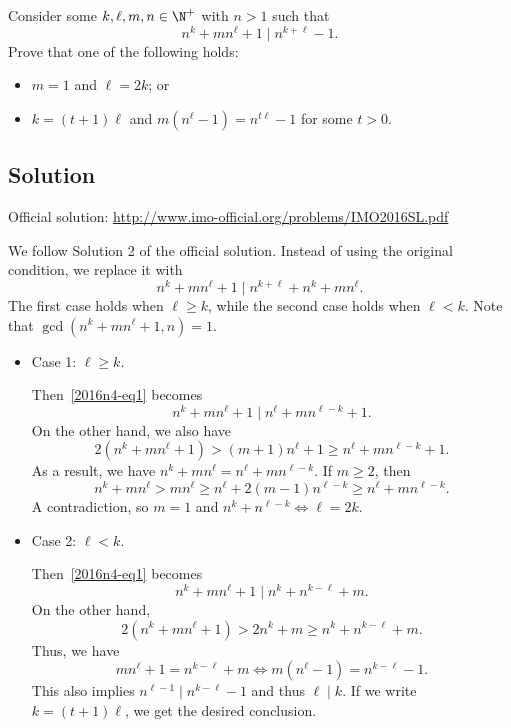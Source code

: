Consider some $k, \ell, m, n \in \N^+$ with $n > 1$ such that
\[ n^k + mn^{\ell} + 1 \mid n^{k + \ell} - 1. \]
Prove that one of the following holds:
\begin{itemize}
    \item   $m = 1$ and $\ell = 2k$; or
    \item   $k = (t + 1) \ell$ and $m(n^{\ell} - 1) = n^{t \ell} - 1$ for some $t > 0$.
\end{itemize}



\subsection*{Solution}

Official solution: \url{http://www.imo-official.org/problems/IMO2016SL.pdf}

We follow Solution 2 of the official solution.
Instead of using the original condition, we replace it with
\[ n^k + mn^{\ell} + 1 \mid n^{k + \ell} + n^k + mn^{\ell}. \tag{1}\label{2016n4-eq1} \]
The first case holds when $\ell \geq k$, while the second case holds when $\ell < k$.
Note that $\gcd(n^k + mn^{\ell} + 1, n) = 1$.

\begin{itemize}

    \item
    Case 1: $\ell \geq k$.

    Then~\eqref{2016n4-eq1} becomes
    \[ n^k + mn^{\ell} + 1 \mid n^{\ell} + mn^{\ell - k} + 1. \]
    On the other hand, we also have
    \[ 2(n^k + mn^{\ell} + 1) > (m + 1) n^{\ell} + 1 \geq n^{\ell} + mn^{\ell - k} + 1. \]
    As a result, we have $n^k + mn^{\ell} = n^{\ell} + mn^{\ell - k}$.
    If $m \geq 2$, then
    \[ n^k + mn^{\ell} > mn^{\ell} \geq n^{\ell} + 2(m - 1) n^{\ell - k} \geq n^{\ell} + mn^{\ell - k}. \]
    A contradiction, so $m = 1$ and $n^k + n^{\ell - k} \iff \ell = 2k$.

    \item 
    Case 2: $\ell < k$.

    Then~\eqref{2016n4-eq1} becomes
    \[ n^k + mn^{\ell} + 1 \mid n^k + n^{k - \ell} + m. \]
    On the other hand,
    \[ 2(n^k + mn^{\ell} + 1) > 2n^k + m \geq n^k + n^{k - \ell} + m. \]
    Thus, we have
    \[ mn^{\ell} + 1 = n^{k - \ell} + m \iff m(n^{\ell} - 1) = n^{k - \ell} - 1. \]
    This also implies $n^{\ell - 1} \mid n^{k - \ell} - 1$ and thus $\ell \mid k$.
    If we write $k = (t + 1) \ell$, we get the desired conclusion.

\end{itemize}
